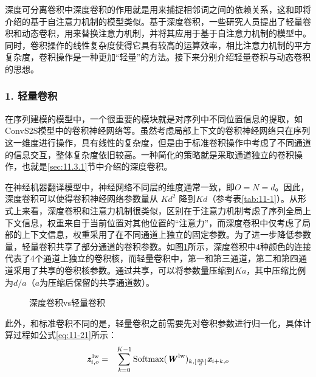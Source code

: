 \parinterval 深度可分离卷积中深度卷积的作用就是用来捕捉相邻词之间的依赖关系，这和{\chaptertwelve}即将介绍的基于自注意力机制的模型类似。基于深度卷积，一些研究人员提出了轻量卷积和动态卷积，用来替换注意力机制，并将其应用于基于自注意力机制的模型中。同时，卷积操作的线性复杂度使得它具有较高的运算效率，相比注意力机制的平方复杂度，卷积操作是一种更加“轻量”的方法。接下来分别介绍轻量卷积与动态卷积的思想。

\subsubsection{1. 轻量卷积}

\parinterval 在序列建模的模型中，一个很重要的模块就是对序列中不同位置信息的提取，如ConvS2S模型中的卷积神经网络等。虽然考虑局部上下文的卷积神经网络只在序列这一维度进行操作，具有线性的复杂度，但是由于标准卷积操作中考虑了不同通道的信息交互，整体复杂度依旧较高。一种简化的策略就是采取通道独立的卷积操作，也就是\ref{sec:11.3.1}节中介绍的深度卷积。

\parinterval 在神经机器翻译模型中，神经网络不同层的维度通常一致，即$O=N=d$。因此，深度卷积可以使得卷积神经网络参数量从 $Kd^2$ 降到$Kd$（参考表\ref{tab:11-1}）。从形式上来看，深度卷积和注意力机制很类似，区别在于注意力机制考虑了序列全局上下文信息，权重来自于当前位置对其他位置的“注意力”，而深度卷积中仅考虑了局部的上下文信息，权重采用了在不同通道上独立的固定参数。为了进一步降低参数量，轻量卷积共享了部分通道的卷积参数。如图\ref{fig:11-18}所示，深度卷积中4种颜色的连接代表了4个通道上独立的卷积核，而轻量卷积中，第一和第三通道，第二和第四通道采用了共享的卷积核参数。通过共享，可以将参数量压缩到$Ka$，其中压缩比例为$d/a$（$a$为压缩后保留的共享通道数）。

\begin{figure}[htp]
\centering

\caption{深度卷积vs轻量卷积}
\label{fig:11-18}
\end{figure}

\parinterval 此外，和标准卷积不同的是，轻量卷积之前需要先对卷积参数进行归一化，具体计算过程如公式\eqref{eq:11-21}所示：
\begin{eqnarray}
\textbf{\em z}_{i,o}^\textrm{\,lw} &=& \sum_{k=0}^{K-1} \textrm{Softmax}(\textbf{\em W}^\textrm{\,lw})_{k,[\frac{oa}{d}]} \textbf{\em x}_{i+k,o}
\label{eq:11-21}
\end{eqnarray}

